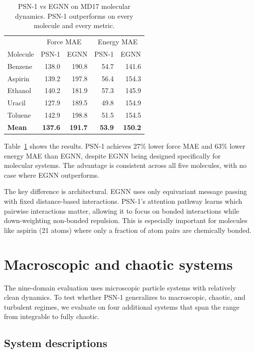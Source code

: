 \documentclass[10pt,twocolumn]{article}
\begin{document}
\begin{table}[ht]
\centering
\caption{PSN-1 vs EGNN on MD17 molecular dynamics. PSN-1 outperforms on every molecule and every metric.}
\label{tab:md17}
\small
\begin{tabular}{@{}lrrrr@{}}
\toprule
 & \multicolumn{2}{c}{Force MAE} & \multicolumn{2}{c}{Energy MAE} \\
Molecule & PSN-1 & EGNN & PSN-1 & EGNN \\
\midrule
Benzene & 138.0 & 190.8 & 54.7 & 141.6 \\
Aspirin & 139.2 & 197.8 & 56.4 & 154.3 \\
Ethanol & 140.2 & 181.9 & 57.3 & 145.9 \\
Uracil & 127.9 & 189.5 & 49.8 & 154.9 \\
Toluene & 142.9 & 198.8 & 51.5 & 154.5 \\
\midrule
\textbf{Mean} & \textbf{137.6} & \textbf{191.7} & \textbf{53.9} & \textbf{150.2} \\
\bottomrule
\end{tabular}
\end{table}

Table~\ref{tab:md17} shows the results. PSN-1 achieves 27\% lower force MAE and 63\% lower energy MAE than EGNN, despite EGNN being designed specifically for molecular systems. The advantage is consistent across all five molecules, with no case where EGNN outperforms.

The key difference is architectural. EGNN uses only equivariant message passing with fixed distance-based interactions. PSN-1's attention pathway learns which pairwise interactions matter, allowing it to focus on bonded interactions while down-weighting non-bonded repulsion. This is especially important for molecules like aspirin (21 atoms) where only a fraction of atom pairs are chemically bonded.

\section{Macroscopic and chaotic systems}

The nine-domain evaluation uses microscopic particle systems with relatively clean dynamics. To test whether PSN-1 generalizes to macroscopic, chaotic, and turbulent regimes, we evaluate on four additional systems that span the range from integrable to fully chaotic.

\subsection{System descriptions}
\end{document}
